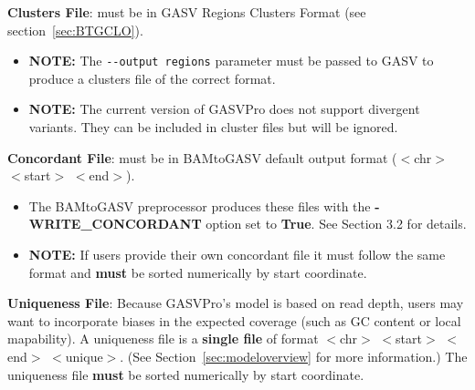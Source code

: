 \documentclass[11pt]{article}
\begin{document}
\begin{description}
\item{\bf Clusters File}: must be in GASV Regions Clusters Format (see section~\ref{sec:BTGCLO}). 
\begin{itemize}
\item {\bf NOTE:} The \verb+--output regions+ parameter must be passed to GASV to produce a clusters file of the correct format. 
\item {\bf NOTE:} The current version of GASVPro does not support divergent variants. They can be included in cluster files but will be ignored. 
\end{itemize}
\item{\bf Concordant File}: must be in BAMtoGASV default output format ($<$chr$>$ $<$start$>$ $<$end$>$). 
\begin{itemize}
\item The BAMtoGASV preprocessor produces these files with the {\bf-WRITE\_CONCORDANT} option set to {\bf True}. See Section 3.2 for details. 
\item {\bf NOTE:} If users provide their own concordant file it must follow the same format and {\bf must} be sorted numerically by start coordinate.
\end{itemize}
\item{\bf Uniqueness File}:  Because GASVPro's model is based on read depth, users may want to incorporate biases in the expected coverage (such as GC content or local mapability). A uniqueness file is a {\bf single file} of format $<$chr$>$ $<$start$>$ $<$end$>$ $<$unique$>$. (See Section~\ref{sec:modeloverview} for more information.) The uniqueness file {\bf must} be sorted numerically by start coordinate.
\end{description}
\end{document}
